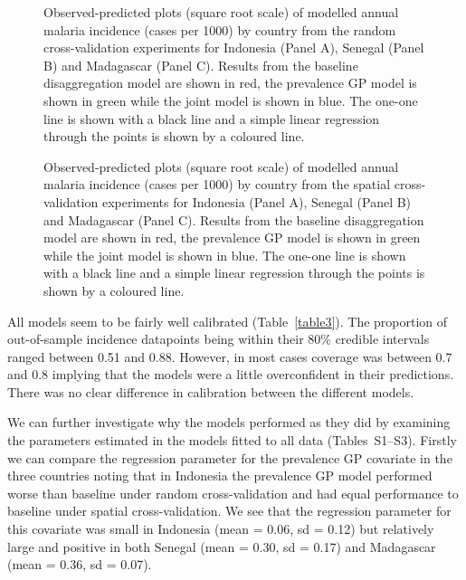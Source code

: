 \documentclass{statsoc}
\begin{document}
\begin{figure}
\caption{\label{randompredobspolyfacet} 
Observed-predicted plots (square root scale) of modelled annual malaria incidence (cases per 1000) by country from the random cross-validation experiments for Indonesia (Panel A), Senegal (Panel B) and Madagascar (Panel C). 
Results from the baseline disaggregation model are shown in red, the prevalence GP model is shown in green while the joint model is shown in blue.
The one-one line is shown with a black line and a simple linear regression through the points is shown by a coloured line.
}

\end{figure}




\begin{figure}
\caption{\label{spatial2predobspolyfacet} 
Observed-predicted plots (square root scale) of modelled annual malaria incidence (cases per 1000) by country from the spatial cross-validation experiments for Indonesia (Panel A), Senegal (Panel B) and Madagascar (Panel C). 
Results from the baseline disaggregation model are shown in red, the prevalence GP model is shown in green while the joint model is shown in blue.
The one-one line is shown with a black line and a simple linear regression through the points is shown by a coloured line.
}

\end{figure}



All models seem to be fairly well calibrated (Table~\ref{table3}).
The proportion of out-of-sample incidence datapoints being within their 80\% credible intervals ranged between 0.51 and 0.88.
However, in most cases coverage was between 0.7 and 0.8 implying that the models were a little overconfident in their predictions.
There was no clear difference in calibration between the different models.


We can further investigate why the models performed as they did by examining the parameters estimated in the models fitted to all data (Tables~S1--S3).
Firstly we can compare the regression parameter for the prevalence GP covariate in the three countries noting that in Indonesia the prevalence GP model performed worse than baseline under random cross-validation and had equal performance to baseline under spatial cross-validation.
We see that the regression parameter for this covariate was small in Indonesia (mean = 0.06, sd = 0.12) but relatively large and positive in both Senegal (mean = 0.30, sd = 0.17) and Madagascar  (mean = 0.36, sd = 0.07).
\end{document}
